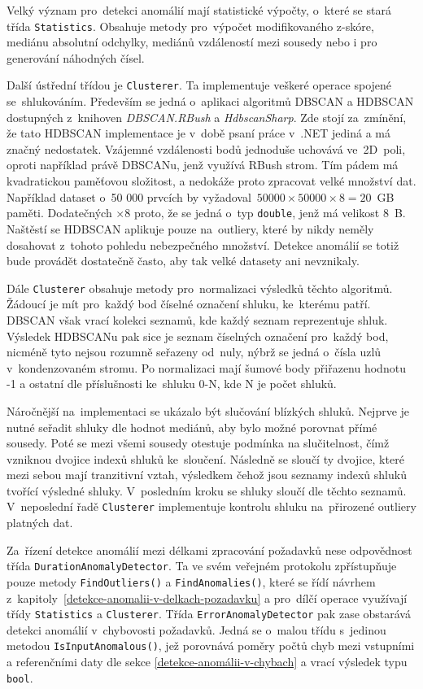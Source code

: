 Velký význam pro~detekci anomálií mají statistické výpočty, o~které se stará třída \texttt{Statistics}. Obsahuje metody pro~výpočet modifikovaného z-skóre, mediánu absolutní odchylky, mediánů vzdáleností mezi sousedy nebo i pro generování náhodných čísel.

Další ústřední třídou je \texttt{Clusterer}. Ta implementuje veškeré operace spojené se~shlukováním. Především se jedná o~aplikaci algoritmů DBSCAN a HDBSCAN dostupných z~knihoven \emph{DBSCAN.RBush} a \emph{HdbscanSharp}. Zde stojí za~zmínění, že tato HDBSCAN implementace je v~době psaní práce v~.NET jediná a má značný nedostatek. Vzájemné vzdálenosti bodů jednoduše uchovává ve~2D~poli, oproti například právě DBSCANu, jenž využívá RBush strom. Tím pádem má kvadratickou paměťovou složitost, a nedokáže proto zpracovat velké množství dat. Například dataset o~50 000 prvcích by vyžadoval~\(50 000\times50 000\times8 = 20\)~GB paměti. Dodatečných \(\times8\) proto, že se jedná o~typ \texttt{double}, jenž má velikost 8~B. Naštěstí se HDBSCAN aplikuje pouze na~outliery, které by nikdy neměly dosahovat z~tohoto pohledu nebezpečného množství. Detekce anomálií se totiž bude provádět dostatečně často, aby tak velké datasety ani nevznikaly.

Dále \texttt{Clusterer} obsahuje metody pro~normalizaci výsledků těchto algoritmů. Žádoucí je mít pro~každý bod číselné označení shluku, ke~kterému patří. DBSCAN však vrací kolekci seznamů, kde každý seznam reprezentuje shluk. Výsledek HDBSCANu pak sice je seznam číselných označení pro~každý bod, nicméně tyto nejsou rozumně seřazeny od~nuly, nýbrž se jedná o~čísla uzlů v~kondenzovaném stromu. Po normalizaci mají šumové body přiřazenu hodnotu -1 a ostatní dle příslušnosti ke~shluku 0-N, kde N je počet shluků.

Náročnější na~implementaci se ukázalo být slučování blízkých shluků. Nejprve je nutné seřadit shluky dle hodnot mediánů, aby bylo možné porovnat přímé sousedy. Poté se mezi všemi sousedy otestuje podmínka na slučitelnost, čímž vzniknou dvojice indexů shluků ke~sloučení. Následně se sloučí ty dvojice, které mezi sebou mají tranzitivní vztah, výsledkem čehož jsou seznamy indexů shluků tvořící výsledné shluky. V~posledním kroku se shluky sloučí dle těchto seznamů. V~neposlední řadě \texttt{Clusterer} implementuje kontrolu shluku na~přirozené outliery platných dat.

Za~řízení detekce anomálií mezi délkami zpracování požadavků nese odpovědnost třída \texttt{DurationAnomalyDetector}. Ta ve svém veřejném protokolu zpřístupňuje pouze metody \texttt{FindOutliers()} a \texttt{FindAnomalies()}, které se řídí návrhem z~kapitoly~\ref{detekce-anomalii-v-delkach-pozadavku} a pro~dílčí operace využívají třídy \texttt{Statistics} a \texttt{Clusterer}. Třída \texttt{ErrorAnomalyDetector} pak zase obstarává detekci anomálií v~chybovosti požadavků. Jedná se o~malou třídu s~jedinou metodou \texttt{IsInputAnomalous()}, jež porovnává poměry počtů chyb mezi vstupními a referenčními daty dle sekce \ref{detekce-anomálii-v-chybach} a vrací výsledek typu \texttt{bool}. 

